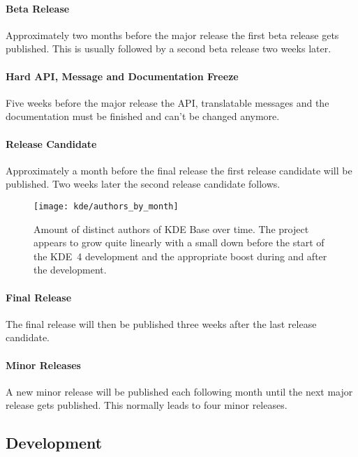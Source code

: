 \paragraph{Beta Release}

Approximately two months before the major release the first beta release gets
published. This is usually followed by a second beta release two weeks later.

\paragraph{Hard API, Message and Documentation Freeze}

Five weeks before the major release the \ac{API}, translatable messages and the
documentation must be finished and can't be changed anymore.

\paragraph{Release Candidate}

Approximately a month before the final release the first release candidate will
be published. Two weeks later the second release candidate follows.

\begin{figure}[htbp]
  \centering
  \texttt{[image: kde/authors\_by\_month]}
  \caption[Authors by Month, KDE]
  {Amount of distinct authors of KDE Base over time. The project appears to
    grow quite linearly with a small down before the start of the KDE~4
    development and the appropriate boost during and after the development.}
\end{figure}

\paragraph{Final Release}

The final release will then be published three weeks after the last release
candidate.

\paragraph{Minor Releases}

A new minor release will be published each following month until the next major
release gets published. This normally leads to four minor releases.


\subsection{Development} %

